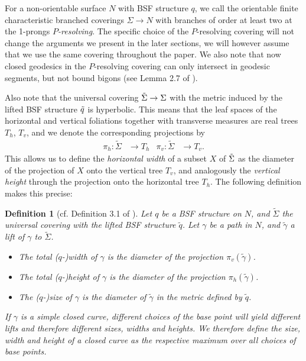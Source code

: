 \documentclass[a4paper]{article}
\newtheorem{definition}[theorem]{Definition}
\begin{document}
For a non-orientable surface $N$ with BSF structure $q$, we call the orientable finite characteristic branched coverings $\Sigma \rightarrow N$ with branches of order at least two at the 1-prongs \emph{$P$-resolving}.
The specific choice of the $P$-resolving covering will not change the arguments we present in the later sections, we will however assume that we use the same covering throughout the paper.
We also note that now closed geodesics in the $P$-resolving covering can only intersect in geodesic segments, but not bound bigons (see Lemma 2.7 of \cite{BHW2}).

Also note that the universal covering $\Tilde{\Sigma}\rightarrow \Sigma$ with the metric induced by the lifted BSF structure $\Tilde{q}$ is hyperbolic.
This means that the leaf spaces of the horizontal and vertical foliations together with transverse measures are real trees $T_h$, $T_v$, and we denote the corresponding projections by
\begin{align*}
    \pi_h\colon \tilde{\Sigma} &\rightarrow T_h & \pi_v\colon \tilde{\Sigma} &\rightarrow T_v.
\end{align*}
This allows us to define the \emph{horizontal width} of a subset $X$ of $\Tilde{\Sigma}$ as the diameter of the projection of $X$ onto the vertical tree $T_v$, and analogously the \emph{vertical height} through the projection onto the horizontal tree $T_h$.
The following definition makes this precise:

\begin{definition}[cf. Definition 3.1 of \cite{BHW2}]\label{def:size}
    Let $q$ be a BSF structure on $N$, and $\tilde{\Sigma}$ the universal covering with the lifted BSF structure $\tilde{q}$.
    Let $\gamma$ be a path in $N$, and $\tilde{\gamma}$ a lift of $\gamma$ to $\tilde{\Sigma}$.
    \begin{itemize}
        \item The \emph{total ($q$-)width} of $\gamma$ is the diameter of the projection $\pi_v(\tilde{\gamma})$.
        \item The \emph{total ($q$-)height} of $\gamma$ is the diameter of the projection $\pi_h(\tilde{\gamma})$.
        \item The \emph{($q$-)size} of $\gamma$ is the diameter of $\tilde{\gamma}$ in the metric defined by $\tilde{q}$.
    \end{itemize}

    If $\gamma$ is a simple closed curve, different choices of the base point will yield different lifts and therefore different sizes, widths and heights.
    We therefore define the size, width and height of a closed curve as the respective maximum over all choices of base points.
\end{definition}
\end{document}
